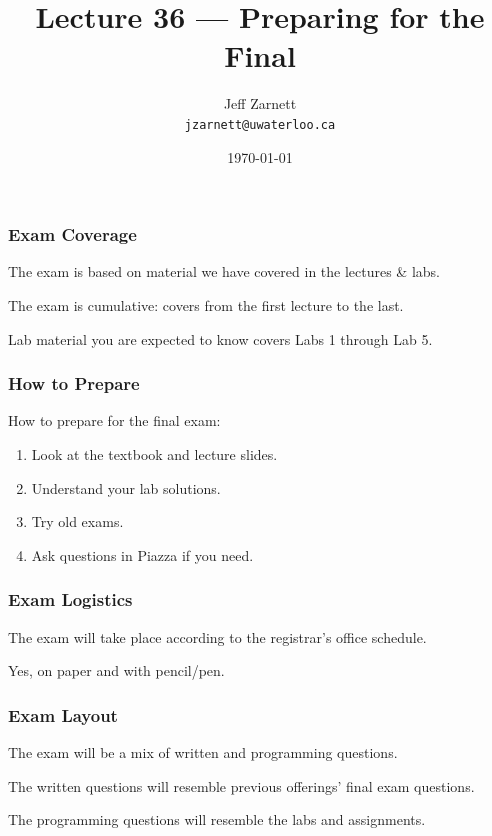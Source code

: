 

\title{Lecture 36 --- Preparing for the Final }

\author{Jeff Zarnett \\ \small \texttt{jzarnett@uwaterloo.ca}}
\date{\today}




\begin{frame}
  \titlepage

\end{frame}

\begin{frame}
\frametitle{Exam Coverage}

The exam is based on material we have covered in the lectures \& labs.

The exam is cumulative: covers from the first lecture to the last.

Lab material you are expected to know covers Labs 1 through Lab 5.

\end{frame}

\begin{frame}
\frametitle{How to Prepare}

How to prepare for the final exam:

\begin{enumerate}
	\item Look at the textbook and lecture slides.
	\item Understand your lab solutions.
	\item Try old exams.
	\item Ask questions in Piazza if you need.
\end{enumerate}

\end{frame}


\begin{frame}
\frametitle{Exam Logistics}

The exam will take place according to the registrar's office schedule.

Yes, on paper and with pencil/pen.

\end{frame}


\begin{frame}
\frametitle{Exam Layout}

The exam will be a mix of written and programming questions.

The written questions will resemble previous offerings' final exam questions.

The programming questions will resemble the labs and assignments.

\end{frame}


